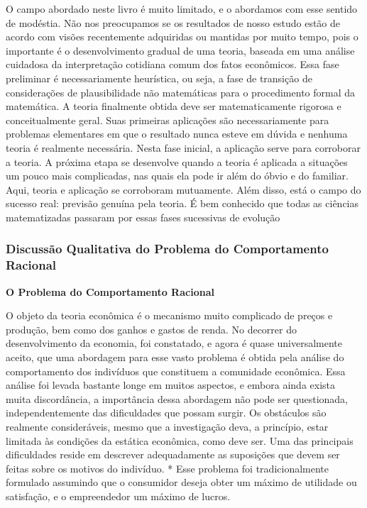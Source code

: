 \documentclass[12pt]{article}
\begin{document}
O campo abordado neste livro é muito limitado, e o abordamos com esse sentido de modéstia. Não nos preocupamos se os resultados de nosso estudo estão de acordo com visões recentemente adquiridas ou mantidas por muito tempo, pois o importante é o desenvolvimento gradual de uma teoria, baseada em uma análise cuidadosa da interpretação cotidiana comum dos fatos econômicos. Essa fase preliminar é necessariamente heurística, ou seja, a fase de transição de considerações de plausibilidade não matemáticas para o procedimento formal da matemática. A teoria finalmente obtida deve ser matematicamente rigorosa e conceitualmente geral. Suas primeiras aplicações são necessariamente para problemas elementares em que o resultado nunca esteve em dúvida e nenhuma teoria é realmente necessária. Nesta fase inicial, a aplicação serve para corroborar a teoria. A próxima etapa se desenvolve quando a teoria é aplicada a situações um pouco mais complicadas, nas quais ela pode ir além do óbvio e do familiar. Aqui, teoria e aplicação se corroboram mutuamente. Além disso, está o campo do sucesso real: previsão genuína pela teoria. É bem conhecido que todas as ciências matematizadas passaram por essas fases sucessivas de evolução

\subsubsection{\textbf{Discussão Qualitativa do Problema do Comportamento Racional}}
\textbf{O Problema do Comportamento Racional}

O objeto da teoria econômica é o mecanismo muito complicado de preços e produção, bem como dos ganhos e gastos de renda. No decorrer do desenvolvimento da economia, foi constatado, e agora é quase universalmente aceito, que uma abordagem para esse vasto problema é obtida pela análise do comportamento dos indivíduos que constituem a comunidade econômica. Essa análise foi levada bastante longe em muitos aspectos, e embora ainda exista muita discordância, a importância dessa abordagem não pode ser questionada, independentemente das dificuldades que possam surgir. Os obstáculos são realmente consideráveis, mesmo que a investigação deva, a princípio, estar limitada às condições da estática econômica, como deve ser. Uma das principais dificuldades reside em descrever adequadamente as suposições que devem ser feitas sobre os motivos do indivíduo. * Esse problema foi tradicionalmente formulado assumindo que o consumidor deseja obter um máximo de utilidade ou satisfação, e o empreendedor um máximo de lucros.
\end{document}
